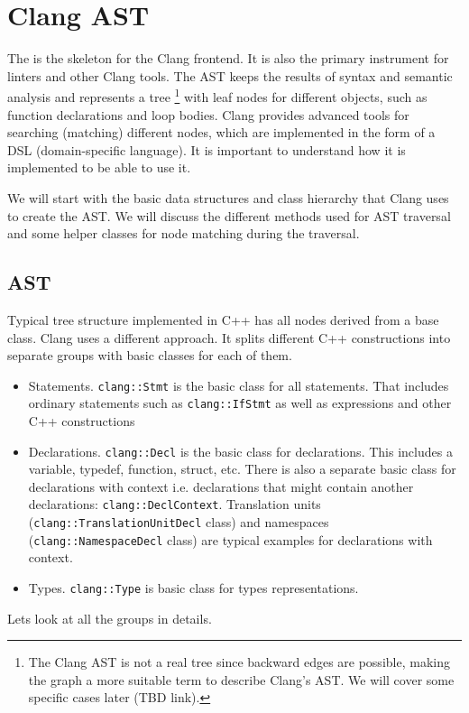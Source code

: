 \chapter{Clang AST}
The \myast is the skeleton for the Clang frontend. It is also the primary
instrument for linters and other Clang tools. The AST keeps the results of
syntax and semantic analysis and represents a tree
\footnote{The Clang AST is not
a real tree since backward edges are possible, making the graph a more suitable
term to describe Clang's AST. We will cover some specific cases later (TBD
link).}
with leaf nodes for different objects, such as function declarations and
loop bodies. Clang provides advanced tools for searching (matching) different
nodes, which are implemented in the form of a DSL (domain-specific language). It
is important to understand how it is implemented to be able to use it.

We will start with the basic data structures and class hierarchy that Clang uses
to create the AST. We will discuss the different methods used for AST traversal
and some helper classes for node matching during the traversal. 

\section{AST}
Typical tree structure implemented in C++ has all nodes derived from a base
class. Clang uses a different approach. It splits different C++ constructions
into separate groups with basic classes for each of them.
\begin{itemize}
  \item Statements. \texttt{clang::Stmt} is the basic class for all
    statements. That includes 
    ordinary statements such as \texttt{clang::IfStmt} as well as expressions
    and other C++ constructions
  \item Declarations. \texttt{clang::Decl} is the basic class for
    declarations. This includes a variable, typedef, function, struct,
    etc. There is also a separate basic class for declarations with context
    i.e. declarations that might contain another declarations:
    \texttt{clang::DeclContext}. Translation units
    (\texttt{clang::TranslationUnitDecl} class) and namespaces
    (\texttt{clang::NamespaceDecl} class) are typical examples for
    declarations with 
    context.  
  \item Types. \texttt{clang::Type} is basic class for types representations.
\end{itemize}
Lets look at all the groups in details.

